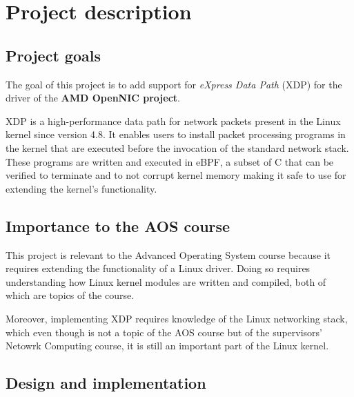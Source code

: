 \documentclass[10pt,a4]{article}
\begin{document}
\section{Project description}

\subsection{Project goals}
The goal of this project is to add support for \textit{eXpress Data Path} (XDP)
for the driver of the \textbf{AMD OpenNIC project}.

XDP is a high-performance data path for network packets present in the Linux
kernel since version 4.8. It enables users to install packet processing programs
in the kernel that are executed before the invocation of the standard network stack.
These programs are written and executed in eBPF, a subset of C that can be
verified to terminate and to not corrupt kernel memory making it safe to use for
extending the kernel's functionality.



\subsection{Importance to the AOS course}
This project is relevant to the Advanced Operating System course because it
requires extending the functionality of a Linux driver. Doing so requires
understanding how Linux kernel modules are written and compiled, both of which
are topics of the course.

Moreover, implementing XDP requires knowledge of the Linux networking
stack, which even though is not a topic of the AOS course but of
the supervisors' Netowrk Computing course, it is still an important part of the
Linux kernel.



\subsection{Design and implementation}

\end{document}

